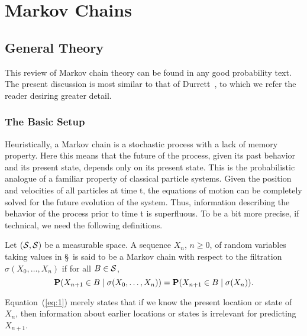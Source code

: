 \chapter{Markov Chains}

\section{General Theory}

This review of Markov chain theory can be found in any good probability text. The present
discussion is most similar to that of Durrett~\cite{Durret:1996}, to which we
refer the reader desiring greater detail. 

\subsection{The Basic Setup}

Heuristically, a Markov chain is a stochastic process with a lack of memory property. Here
this means that the future of the process, given its past behavior and its present state, depends only
on its present state. This is the probabilistic analogue of a familiar property of classical particle
systems. Given the position and velocities of all particles at time t, the equations of motion can be
completely solved for the future evolution of the system. Thus, information describing the behavior
of the process prior to time t is superﬂuous. To be a bit more precise, if technical, we need the
following definitions.

\begin{definition}
Let $(\S, \S)$ be a measurable space. A sequence $X_n$, $n\geq 0$, of random variables
taking values in \S\ is said to be a Markov chain with respect to the filtration 
$\sigma(X_0, \dots, X_{n})$ if for all $B \in \S$,
\begin{equation}
\label{eq:1}
\bP(X_{n+1} \in B \mid \sigma(X_0, \dots, X_{n}))
=\bP(X_{n+1} \in B \mid \sigma(X_{n})).
\end{equation}
\end{definition}
Equation~(\ref{eq:1}) merely states that if we know the present location or state of $X_{n}$,
then information about earlier locations or states is irrelevant for predicting $X_{n+1}$.

